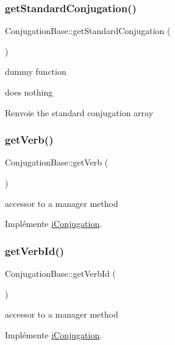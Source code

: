 \subsubsection{\texorpdfstring{get\+Standard\+Conjugation()}{getStandardConjugation()}}
{\footnotesize\ttfamily Conjugation\+Base\+::get\+Standard\+Conjugation (\begin{DoxyParamCaption}{ }\end{DoxyParamCaption})\hspace{0.3cm}{\ttfamily [protected]}}



dummy function 

does nothing

\begin{DoxyReturn}{Renvoie}
the standard conjugation array 
\end{DoxyReturn}
\hypertarget{classConjugationBase_a732cbfda6f4c28efeec68fc85aa9b65a}{}\label{classConjugationBase_a732cbfda6f4c28efeec68fc85aa9b65a} 
\subsubsection{\texorpdfstring{get\+Verb()}{getVerb()}}
{\footnotesize\ttfamily Conjugation\+Base\+::get\+Verb (\begin{DoxyParamCaption}{ }\end{DoxyParamCaption})}

accessor to a manager method 

Implémente \hyperlink{interfaceiConjugation}{i\+Conjugation}.

\hypertarget{classConjugationBase_a918aff5acf4210cf363a13cf39e2430d}{}\label{classConjugationBase_a918aff5acf4210cf363a13cf39e2430d} 
\subsubsection{\texorpdfstring{get\+Verb\+Id()}{getVerbId()}}
{\footnotesize\ttfamily Conjugation\+Base\+::get\+Verb\+Id (\begin{DoxyParamCaption}{ }\end{DoxyParamCaption})}

accessor to a manager method 

Implémente \hyperlink{interfaceiConjugation_aa34e7af66125d28af4f485529d456a74}{i\+Conjugation}.

